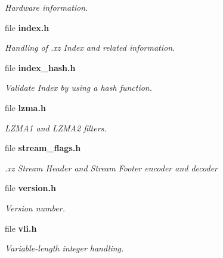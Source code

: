 \begin{DoxyCompactItemize}
\begin{DoxyCompactList}\small\item\em Hardware information. \end{DoxyCompactList}\item 
file {\bf index.\-h}
\begin{DoxyCompactList}\small\item\em Handling of .xz Index and related information. \end{DoxyCompactList}\item 
file {\bf index\-\_\-hash.\-h}
\begin{DoxyCompactList}\small\item\em Validate Index by using a hash function. \end{DoxyCompactList}\item 
file {\bf lzma.\-h}
\begin{DoxyCompactList}\small\item\em L\-Z\-M\-A1 and L\-Z\-M\-A2 filters. \end{DoxyCompactList}\item 
file {\bf stream\-\_\-flags.\-h}
\begin{DoxyCompactList}\small\item\em .xz Stream Header and Stream Footer encoder and decoder \end{DoxyCompactList}\item 
file {\bf version.\-h}
\begin{DoxyCompactList}\small\item\em Version number. \end{DoxyCompactList}\item 
file {\bf vli.\-h}
\begin{DoxyCompactList}\small\item\em Variable-\/length integer handling. \end{DoxyCompactList}\end{DoxyCompactItemize}
